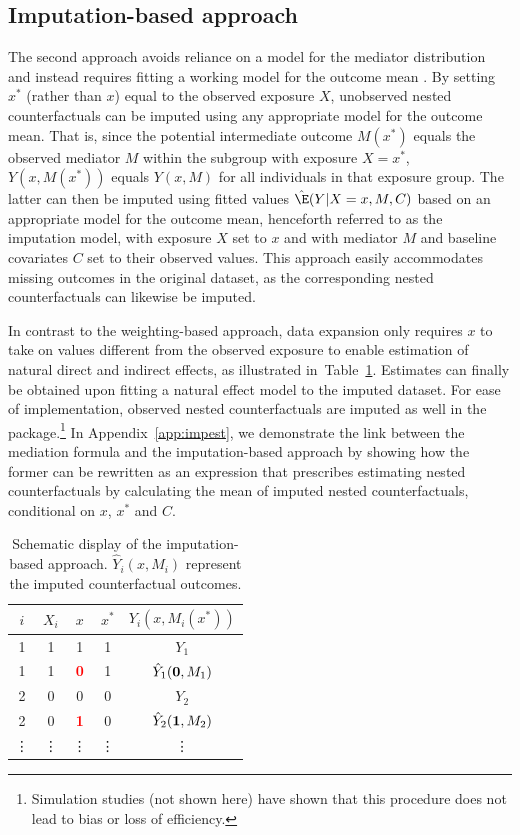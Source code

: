 \documentclass[nojss]{jss}
\begin{document}
\newpage
\subsection{Imputation-based approach}\label{imp-appr}
The second approach avoids reliance on a model for the mediator distribution and instead requires fitting a working model for the outcome mean \citep{Vansteelandt2012}. By setting $x^*$ (rather than $x$) equal to the observed exposure $X$, unobserved nested counterfactuals can be imputed using any appropriate model for the outcome mean. That is, since the potential intermediate outcome $M(x^*)$ equals the observed mediator $M$ within the subgroup with exposure $X = x^*$, $Y(x,M(x^*))$ equals $Y(x,M)$ for all individuals in that exposure group. The latter can then be imputed using fitted values $\hat \E(Y \vert X = x,M,C)$ based on an appropriate model for the outcome mean, henceforth referred to as the imputation model, with exposure $X$ set to $x$ and with mediator $M$ and baseline covariates $C$ set to their observed values. This approach easily accommodates missing outcomes in the original dataset, as the corresponding nested counterfactuals can likewise be imputed.
\par In contrast to the weighting-based approach, data expansion only requires $x$ to take on values different from the observed exposure to enable estimation of natural direct and indirect effects, as illustrated in~Table~\ref{tab-exp3}. Estimates can finally be obtained upon fitting a natural effect model to the imputed dataset. For ease of implementation, observed nested counterfactuals are imputed as well in the  package.\footnote{Simulation studies (not shown here) have shown that this procedure does not lead to bias or loss of efficiency.} In Appendix~\ref{app:impest}, we demonstrate the link between the mediation formula and the imputation-based approach by showing how the former can be rewritten as an expression that prescribes estimating nested counterfactuals by calculating the mean of imputed nested counterfactuals, conditional on $x$, $x^*$ and $C$.
\begin{table}[h]
\centering
\begin{tabular}{ccccc}
\toprule
$i$ & $X_i$ & $x$ & $x^*$ & $Y_i(x,M_i(x^*))$\\
\midrule
1 & 1 & 1 & 1 & $Y_1$\\
\rowcolor[gray]{.9}
1 & 1 & \textcolor{red}{\bf 0} & 1 & \textcolor{red}{$\hat Y_1({\bf 0},M_1)$}\\ 
2 & 0 & 0 & 0 & $Y_2$\\
\rowcolor[gray]{.9}
2 & 0 & \textcolor{red}{\bf 1} & 0 & \textcolor{red}{$\hat Y_2({\bf 1},M_2)$}\\ 
\vdots & \vdots & \vdots & \vdots & \vdots\\
\bottomrule
\end{tabular}
\caption{Schematic display of the imputation-based approach. $\hat Y_i(x,M_i)$ represent the imputed counterfactual outcomes.}\label{tab-exp3}
\end{table}
\end{document}

